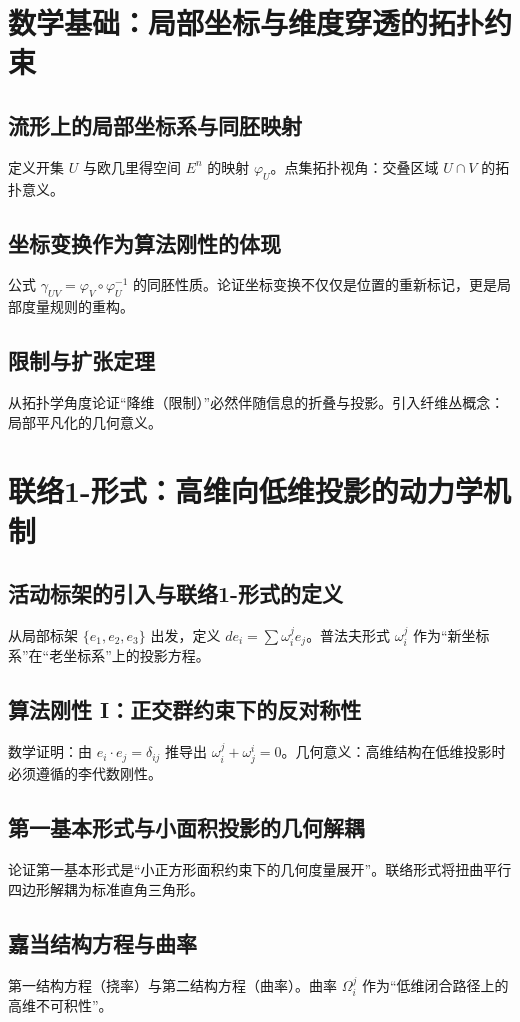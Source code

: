 \documentclass[11pt,a4paper]{article}
\begin{document}
\section{数学基础：局部坐标与维度穿透的拓扑约束}
\subsection{流形上的局部坐标系与同胚映射}
定义开集 \(U\) 与欧几里得空间 \(E^n\) 的映射 \(\varphi_U\)。点集拓扑视角：交叠区域 \(U\cap V\) 的拓扑意义。
\subsection{坐标变换作为算法刚性的体现}
公式 \(\gamma_{UV}=\varphi_V\circ\varphi_U^{-1}\) 的同胚性质。论证坐标变换不仅仅是位置的重新标记，更是局部度量规则的重构。
\subsection{限制与扩张定理}
从拓扑学角度论证“降维（限制）”必然伴随信息的折叠与投影。引入纤维丛概念：局部平凡化的几何意义。

\section{联络1-形式：高维向低维投影的动力学机制}
\subsection{活动标架的引入与联络1-形式的定义}
从局部标架 \(\{e_1,e_2,e_3\}\) 出发，定义 \(de_i=\sum \omega_i^j e_j\)。普法夫形式 \(\omega_i^j\) 作为“新坐标系”在“老坐标系”上的投影方程。
\subsection{算法刚性 I：正交群约束下的反对称性}
数学证明：由 \(e_i\cdot e_j=\delta_{ij}\) 推导出 \(\omega_i^j+\omega_j^i=0\)。几何意义：高维结构在低维投影时必须遵循的李代数刚性。
\subsection{第一基本形式与小面积投影的几何解耦}
论证第一基本形式是“小正方形面积约束下的几何度量展开”。联络形式将扭曲平行四边形解耦为标准直角三角形。
\subsection{嘉当结构方程与曲率}
第一结构方程（挠率）与第二结构方程（曲率）。曲率 \(\Omega_i^j\) 作为“低维闭合路径上的高维不可积性”。
\end{document}
